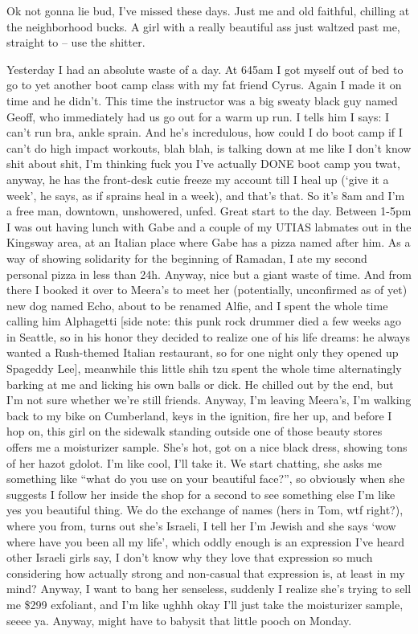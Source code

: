 \documentclass[12pt]{article}
\begin{document}
Ok not gonna lie bud, I've missed these days. Just me and old faithful, chilling at the neighborhood bucks. A girl with a really beautiful ass just waltzed past me, straight to -- use the shitter. 

Yesterday I had an absolute waste of a day. At 645am I got myself out of bed to go to yet another boot camp class with my fat friend Cyrus. Again I made it on time and he didn't. This time the instructor was a big sweaty black guy named Geoff, who immediately had us go out for a warm up run. I tells him I says: I can't run bra, ankle sprain. And he's incredulous, how could I do boot camp if I can't do high impact workouts, blah blah, is talking down at me like I don't know shit about shit, I'm thinking fuck you I've actually DONE boot camp you twat, anyway, he has the front-desk cutie freeze my account till I heal up (`give it a week', he says, as if sprains heal in a week), and that's that. So it's 8am and I'm a free man, downtown, unshowered, unfed. Great start to the day. Between 1-5pm I was out having lunch with Gabe and a couple of my UTIAS labmates out in the Kingsway area, at an Italian place where Gabe has a pizza named after him. As a way of showing solidarity for the beginning of Ramadan, I ate my second personal pizza in less than 24h. Anyway, nice but a giant waste of time. And from there I booked it over to Meera's to meet her (potentially, unconfirmed as of yet) new dog named Echo, about to be renamed Alfie, and I spent the whole time calling him Alphagetti [side note: this punk rock drummer died a few weeks ago in Seattle, so in his honor they decided to realize one of his life dreams: he always wanted a Rush-themed Italian restaurant, so for one night only they opened up Spageddy Lee], meanwhile this little shih tzu spent the whole time alternatingly barking at me and licking his own balls or dick. He chilled out by the end, but I'm not sure whether we're still friends. Anyway, I'm leaving Meera's, I'm walking back to my bike on Cumberland, keys in the ignition, fire her up, and before I hop on, this girl on the sidewalk standing outside one of those beauty stores offers me a moisturizer sample. She's hot, got on a nice black dress, showing tons of her hazot gdolot. I'm like cool, I'll take it. We start chatting, she asks me something like ``what do you use on your beautiful face?'', so obviously when she suggests I follow her inside the shop for a second to see something else I'm like yes you beautiful thing. We do the exchange of names (hers in Tom, wtf right?), where you from, turns out she's Israeli, I tell her I'm Jewish and she says `wow where have you been all my life', which oddly enough is an expression I've heard other Israeli girls say, I don't know why they love that expression so much considering how actually strong and non-casual that expression is, at least in my mind? Anyway, I want to bang her senseless, suddenly I realize she's trying to sell me \$299 exfoliant, and I'm like ughhh okay I'll just take the moisturizer sample, seeee ya. Anyway, might have to babysit that little pooch on Monday.
\end{document}
